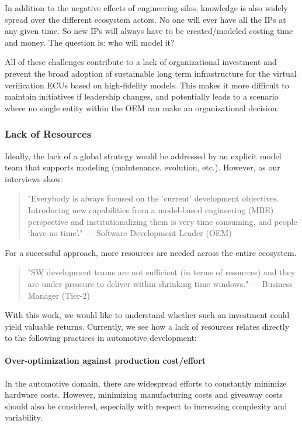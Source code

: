 In addition to the negative effects of engineering silos, knowledge is also widely spread over the different ecosystem actors.
No one will ever have all the IPs at any given time. So new IPs will always have to be created/modeled costing time and money. The question is: who will model it?

All of these challenges contribute to a lack of organizational investment and prevent the broad adoption of sustainable long term infrastructure for the virtual verification ECUs based on high-fidelity models. This makes it more difficult to maintain initiatives if leadership changes, and potentially leads to a scenario where no single entity within the OEM can make an organizational decision.

\subsubsection{Lack of Resources}
Ideally, the lack of a global strategy would be addressed by an explicit model team that supports modeling (maintenance, evolution, etc.). However, as our interviews show:

\begin{quote}
"Everybody is always focused on the 'current' development objectives. Introducing new capabilities from a model-based engineering (MBE) perspective and institutionalizing them is very time consuming, and people ‘have no time’." 
— Software Development Leader (OEM)
\end{quote}

For a successful approach, more resources are needed across the entire ecosystem.
\begin{quote}
"SW development teams are not sufficient (in terms of resources) and they are under pressure to deliver within shrinking time windows." 
— Business Manager (Tier-2)
\end{quote}

With this work, we would like to understand whether such an investment could yield valuable returns. Currently, we see how a lack of resources relates directly to the following practices in automotive development:

\paragraph{Over-optimization against production cost/effort}
In the automotive domain, there are widespread efforts to constantly minimize hardware costs. However, minimizing manufacturing costs and giveaway costs should also be considered, especially with respect to increasing complexity and variability.

